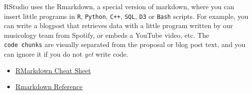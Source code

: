 \documentclass[
  a4paper,
  openany, a4paper, oneside]{book}
\providecommand{\tightlist}{%
  \setlength{\itemsep}{0pt}\setlength{\parskip}{0pt}}
\begin{document}
RStudio uses the Rmarkdown, a special version of markdown, where you can insert little programs in \texttt{R}, \texttt{Python}, \texttt{C++}, \texttt{SQL}, \texttt{D3} or \texttt{Bash} scripts. For example, you can write a blogpost that retrieves data with a little program written by our musicology team from Spotify, or embeds a YouTube video, etc. The \texttt{code\ chunks} are visually separated from the proposal or blog post text, and you can ignore it if you do not \emph{yet} write code.

\begin{itemize}
\tightlist
\item
  \href{https://rstudio.com/wp-content/uploads/2016/03/rmarkdown-cheatsheet-2.0.pdf?_ga=2.126386957.1623649708.1603024238-59012930.1603024238}{RMarkdown Cheat Sheet}
\item
  \href{https://rstudio.com/wp-content/uploads/2015/03/rmarkdown-reference.pdf?_ga=2.68348561.1623649708.1603024238-59012930.1603024238}{Rmarkdown Reference}
\end{itemize}

  
\end{document}
